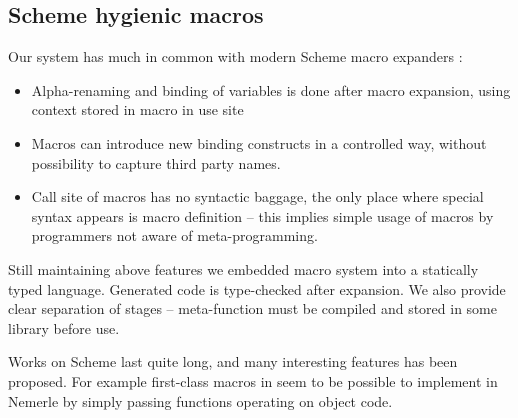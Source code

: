 \documentclass{llncs}
\begin{document}
\subsection{Scheme hygienic macros}
Our system has much in common with modern Scheme macro expanders \cite{Scheme:HygienicAlg}:
\begin{itemize}
\item Alpha-renaming and binding of variables is done after macro expansion, using
      context stored in macro in use site
\item Macros can introduce new binding constructs in a controlled way,
      without possibility to capture third party names.
\item Call site of macros has no syntactic baggage, the only place where
      special syntax appears is macro definition -- this implies simple
      usage of macros by programmers not aware of meta-programming.
\end{itemize}

Still maintaining above features we embedded macro system into a statically typed
language. Generated code is type-checked after expansion. We also provide clear
separation of stages -- meta-function must be compiled and stored in some library
before use.

Works on Scheme last quite long, and many interesting features has been proposed.
For example first-class macros in \cite{Macros:FirstClass} seem to be possible
to implement in Nemerle by simply passing functions operating on object code.
\end{document}
